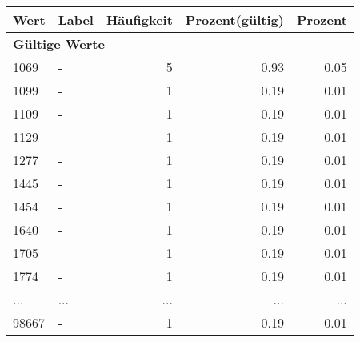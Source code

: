      \begin{longtable}{lXrrr}
     \toprule
     \textbf{Wert} & \textbf{Label} & \textbf{Häufigkeit} & \textbf{Prozent(gültig)} & \textbf{Prozent} \\
     \endhead
     \midrule
     \multicolumn{5}{l}{\textbf{Gültige Werte}}\\
        1069 & \multicolumn{1}{X}{-} & %
          \num{5} &
          \num[round-mode=places,round-precision=2]{0,93} &
          \num[round-mode=places,round-precision=2]{0,05} \\
        1099 & \multicolumn{1}{X}{-} & %
          \num{1} &
          \num[round-mode=places,round-precision=2]{0,19} &
          \num[round-mode=places,round-precision=2]{0,01} \\
        1109 & \multicolumn{1}{X}{-} & %
          \num{1} &
          \num[round-mode=places,round-precision=2]{0,19} &
          \num[round-mode=places,round-precision=2]{0,01} \\
        1129 & \multicolumn{1}{X}{-} & %
          \num{1} &
          \num[round-mode=places,round-precision=2]{0,19} &
          \num[round-mode=places,round-precision=2]{0,01} \\
        1277 & \multicolumn{1}{X}{-} & %
          \num{1} &
          \num[round-mode=places,round-precision=2]{0,19} &
          \num[round-mode=places,round-precision=2]{0,01} \\
        1445 & \multicolumn{1}{X}{-} & %
          \num{1} &
          \num[round-mode=places,round-precision=2]{0,19} &
          \num[round-mode=places,round-precision=2]{0,01} \\
        1454 & \multicolumn{1}{X}{-} & %
          \num{1} &
          \num[round-mode=places,round-precision=2]{0,19} &
          \num[round-mode=places,round-precision=2]{0,01} \\
        1640 & \multicolumn{1}{X}{-} & %
          \num{1} &
          \num[round-mode=places,round-precision=2]{0,19} &
          \num[round-mode=places,round-precision=2]{0,01} \\
        1705 & \multicolumn{1}{X}{-} & %
          \num{1} &
          \num[round-mode=places,round-precision=2]{0,19} &
          \num[round-mode=places,round-precision=2]{0,01} \\
        1774 & \multicolumn{1}{X}{-} & %
          \num{1} &
          \num[round-mode=places,round-precision=2]{0,19} &
          \num[round-mode=places,round-precision=2]{0,01} \\
       ... & ... & ... & ... & ... \\
        98667 & \multicolumn{1}{X}{-} & %
          \num{1} &
          \num[round-mode=places,round-precision=2]{0,19} &
          \num[round-mode=places,round-precision=2]{0,01} \\


\end{longtable}
